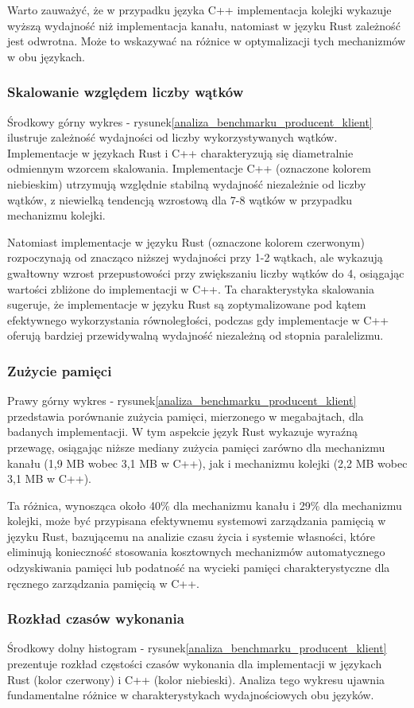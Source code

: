 Warto zauważyć, że w przypadku języka C++ implementacja kolejki wykazuje wyższą wydajność niż implementacja kanału, natomiast w języku Rust zależność jest odwrotna. Może to wskazywać na różnice w optymalizacji tych mechanizmów w obu językach.

\subsubsection{Skalowanie względem liczby wątków}
Środkowy górny wykres - rysunek\ref{analiza_benchmarku_producent_klient} ilustruje zależność wydajności od liczby wykorzystywanych wątków. Implementacje w językach Rust i C++ charakteryzują się diametralnie odmiennym wzorcem skalowania. Implementacje C++ (oznaczone kolorem niebieskim) utrzymują względnie stabilną wydajność niezależnie od liczby wątków, z niewielką tendencją wzrostową dla 7-8 wątków w przypadku mechanizmu kolejki.

Natomiast implementacje w języku Rust (oznaczone kolorem czerwonym) rozpoczynają od znacząco niższej wydajności przy 1-2 wątkach, ale wykazują gwałtowny wzrost przepustowości przy zwiększaniu liczby wątków do 4, osiągając wartości zbliżone do implementacji w C++. Ta charakterystyka skalowania sugeruje, że implementacje w języku Rust są zoptymalizowane pod kątem efektywnego wykorzystania równoległości, podczas gdy implementacje w C++ oferują bardziej przewidywalną wydajność niezależną od stopnia paralelizmu.

\subsubsection{Zużycie pamięci}
Prawy górny wykres - rysunek\ref{analiza_benchmarku_producent_klient} przedstawia porównanie zużycia pamięci, mierzonego w megabajtach, dla badanych implementacji. W tym aspekcie język Rust wykazuje wyraźną przewagę, osiągając niższe mediany zużycia pamięci zarówno dla mechanizmu kanału (1,9 MB wobec 3,1 MB w C++), jak i mechanizmu kolejki (2,2 MB wobec 3,1 MB w C++).

Ta różnica, wynosząca około 40\% dla mechanizmu kanału i 29\% dla mechanizmu kolejki, może być przypisana efektywnemu systemowi zarządzania pamięcią w języku Rust, bazującemu na analizie czasu życia i systemie własności, które eliminują konieczność stosowania kosztownych mechanizmów automatycznego odzyskiwania pamięci lub podatność na wycieki pamięci charakterystyczne dla ręcznego zarządzania pamięcią w C++.

\subsubsection{ Rozkład czasów wykonania}
Środkowy dolny histogram - rysunek\ref{analiza_benchmarku_producent_klient} prezentuje rozkład częstości czasów wykonania dla implementacji w językach Rust (kolor czerwony) i C++ (kolor niebieski). Analiza tego wykresu ujawnia fundamentalne różnice w charakterystykach wydajnościowych obu języków.

